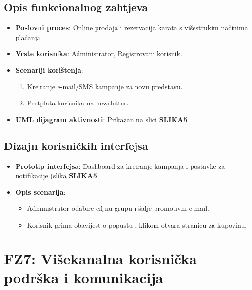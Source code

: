 \subsection{Opis funkcionalnog zahtjeva}  
\begin{itemize}  
    \item \textbf{Poslovni proces}: Online prodaja i rezervacija karata s višestrukim načinima plaćanja 
    \item \textbf{Vrste korisnika}: Administrator, Registrovani korisnik.  
    \item \textbf{Scenariji korištenja}:  
        \begin{enumerate}  
            \item Kreiranje e-mail/SMS kampanje za novu predstavu.  
            \item Pretplata korisnika na newsletter.  
        \end{enumerate}  
    \item \textbf{UML dijagram aktivnosti}: Prikazan na slici \textbf{SLIKA5}  
\end{itemize}  

\sloppy  
\subsection{Dizajn korisničkih interfejsa}  
\begin{itemize}  
    \item \textbf{Prototip interfejsa}: Dashboard za kreiranje kampanja i postavke za notifikacije (slika \textbf{SLIKA5}  
    \item \textbf{Opis scenarija}:  
        \begin{itemize}  
            \item Administrator odabire ciljnu grupu i šalje promotivni e-mail.  
            \item Korisnik prima obavijest o popustu i klikom otvara stranicu za kupovinu.  
        \end{itemize}  
\end{itemize}  

\sloppy  
\section{FZ7: Višekanalna korisnička podrška i komunikacija}  

\sloppy  
